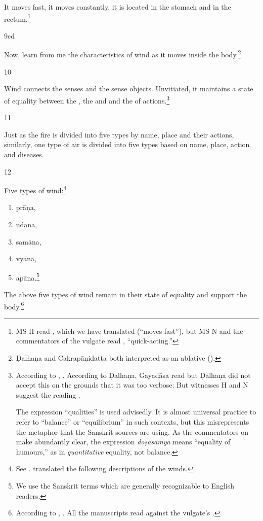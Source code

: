 \begin{translation}
It moves fast, it moves constantly, it is located in the stomach and
in the rectum.\footnote{MS H read , which we have translated 
(“moves fast”), but MS N and the commentators of the vulgate read 
, “quick-acting.”}

\item[9cd] 

Now, learn from me the characteristics of wind as it moves inside the
body.\footnote{Ḍalhaṇa and Cakrapāṇidatta both interpreted  as an 
ablative ().}

\item[10] 

Wind connects the senses and the sense objects.  Unvitiated, it
maintains a state of equality between the , the
 and  and the
 of actions.\footnote{According to
    , . 
    According to Ḍalhaṇa,
    Gayadāsa read  but 
    Ḍalhaṇa did not accept
    this on the grounds that it was too verbose:  But witnesses H and N suggest the reading
    .  
    
    The expression “qualities” is used advisedly. It is almost
universal practice to refer to “balance” or “equilibrium” in such
contexts, but this misrepresents the metaphor that the Sanskrit
sources are using. As the commentators on \AH\ 
make abundantly clear, the expression \emph{doṣasāmya} means
“equality of humours,” as in \emph{quantitative} equality, not
balance.}

\item[11] 

Just as the fire is divided into five types by name, place and their
actions, similarly, one type of air is divided into five types based
on name, place, action and diseases.

\item[12] 

Five types of wind:\footnote{See \cite{zysk-1993}.  \citet[S110]{zysk-2007} 
translated the following descriptions of the winds.}
\begin{enumerate}
\item prāṇa,
\item udāna,
\item samāna,
\item vyāna,
\item apāna.\footnote{We use the Sanskrit terms which 
are generally recognizable to English readers.}
\end{enumerate}
The above five types of wind remain in their state of equality and
support the body.\footnote{According to ,
    . All the manuscripts read
      against the
    vulgate's .}




\end{translation}
